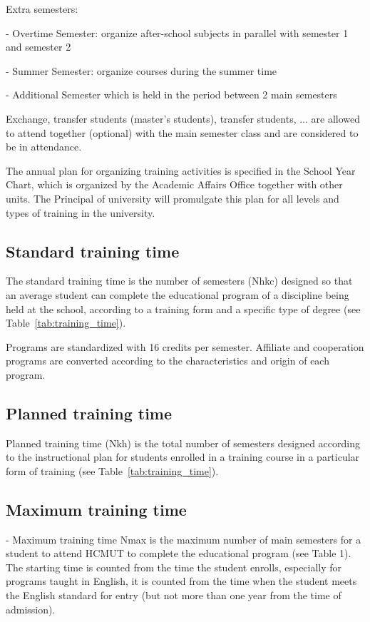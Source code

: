 Extra semesters:

- Overtime Semester: organize after-school subjects in parallel with semester 1 and semester 2

- Summer Semester: organize courses during the summer time

- Additional Semester which is held in the period between 2 main semesters

Exchange, transfer students (master's students), transfer students, ... are allowed to attend together (optional) with the main semester class and are considered to be in attendance.

The annual plan for organizing training activities is specified in the School Year Chart, which is organized by the Academic Affairs Office together with other units. The Principal of university will promulgate this plan for all levels and types of training in the university.

\subsection{Standard training time}
The standard training time is the number of semesters (Nhkc) designed so that an average student can complete the educational program of a discipline being held at the school, according to a training form and a specific type of degree (see Table~\ref{tab:training_time}).

Programs are standardized with 16 credits per semester. Affiliate and cooperation programs are converted according to the characteristics and origin of each program.

\subsection{Planned training time}
Planned training time (Nkh) is the total number of semesters designed according to the instructional plan for students enrolled in a training course in a particular form of training (see Table~\ref{tab:training_time}).

\subsection{Maximum training time}
- Maximum training time Nmax is the maximum number of main semesters for a student to attend HCMUT to complete the educational program (see Table 1). The starting time is counted from the time the student enrolls, especially for programs taught in English, it is counted from the time when the student meets the English standard for entry (but not more than one year from the time of admission).

